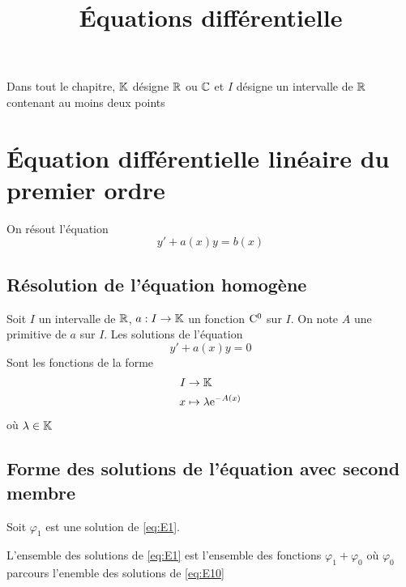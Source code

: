 

\title{\'Equations différentielle}



\maketitle
\pagebreak
\tableofcontents

Dans tout le chapitre, $\mathbb{K}$ désigne $\mathbb{R}$ ou $\mathbb{C}$ et $I$
désigne un intervalle de $\mathbb{R}$ contenant au moins deux points

\section{\'Equation différentielle linéaire du premier ordre}

On résout l'équation
\begin{equation} \label{eq:E1}
    y' + a(x)y = b(x)
\end{equation}

\subsection{Résolution de l'équation homogène}

\begin{thm}
Soit $I$ un intervalle de $\mathbb{R}$, $a : I \to \mathbb{K}$ un fonction $\mathrm{C^{0}}$ sur
$I$. On note $A$ une primitive de $a$ sur $I$. Les solutions de
l'équation
\begin{equation} \label{eq:E10}
    y' + a(x) y = 0
\end{equation}
Sont les fonctions de la forme
\begin{align*}
I &\to \mathbb{K} \\
x &\mapsto \lambda \mathrm{e}^{-A(x)}
\end{align*}
où $\lambda \in \mathbb{K}$
\end{thm}

\subsection{Forme des solutions de l'équation avec second membre}

\begin{prp}
Soit $\varphi_1$ est une solution de \eqref{eq:E1}.

L'ensemble des solutions de \eqref{eq:E1} est l'ensemble des fonctions
$\varphi_1 + \varphi_0$ où $\varphi_0$ parcours l'enemble des solutions
de \eqref{eq:E10}
\end{prp}

